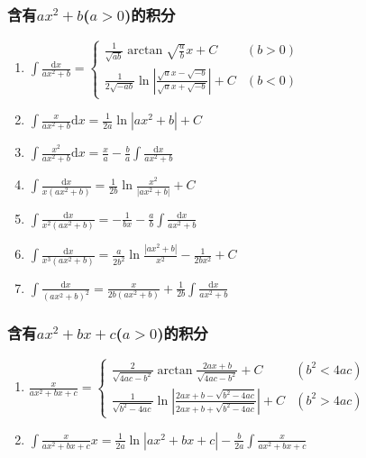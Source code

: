 \documentclass{book}
\begin{document}
\subsubsection{含有$ax^2+b$($a>0$)的积分}

\begin{enumerate}

\item $ \int \frac{\mathrm{d}x}{ax^2+b} = \begin{cases}
\frac{1}{\sqrt{ab}} \arctan \sqrt{\frac{a}{b}} x + C & (b > 0) \\
\frac{1}{2\sqrt{-ab}} \ln\left| \frac{\sqrt{a}x-\sqrt{-b}}{\sqrt{a}x+\sqrt{-b}} \right| + C & (b < 0)
\end{cases} $

\item $ \int \frac{x}{ax^2+b} \mathrm{d}x = \frac{1}{2a} \ln \left| ax^2 + b \right| + C $

\item $ \int \frac{x^2}{ax^2+b} \mathrm{d}x = \frac{x}{a} - \frac{b}{a}\int \frac{\mathrm{d}x}{ax^2+b} $

\item $ \int \frac{\mathrm{d}x}{x(ax^2+b)} = \frac{1}{2b} \ln \frac{x^2}{|ax^2+b|} + C $

\item $ \int \frac{\mathrm{d}x}{x^2(ax^2+b)} = -\frac{1}{bx} - \frac{a}{b} \int \frac{\mathrm{d}x}{ax^2+b} $

\item $ \int \frac{\mathrm{d}x}{x^3(ax^2+b)} = \frac{a}{2b^2} \ln \frac{|ax^2+b|}{x^2} - \frac{1}{2bx^2} + C $

\item $ \int \frac{\mathrm{d}x}{(ax^2+b)^2} = \frac{x}{2b(ax^2+b)} + \frac{1}{2b} \int \frac{\mathrm{d}x}{ax^2+b} $

\end{enumerate}

\subsubsection{含有$ax^2+bx+c$($a>0$)的积分}

\begin{enumerate}

\item $ \frac{ x}{ax^2+bx+c} = \begin{cases}
\frac{2}{\sqrt{4ac-b^2}}\arctan\frac{2ax+b}{\sqrt{4ac-b^2}} + C & (b^2 < 4ac) \\
\frac{1}{\sqrt{b^2-4ac}}\ln\left| \frac{2ax+b-\sqrt{b^2-4ac}}{2ax+b+\sqrt{b^2-4ac}} \right| + C & (b^2 > 4ac)
\end{cases} $

\item $ \int \frac{x}{ax^2+bx+c}  x = \frac{1}{2a} \ln |ax^2+bx+c| - \frac{b}{2a} \int \frac{ x}{ax^2+bx+c} $

\end{enumerate}
\end{document}
